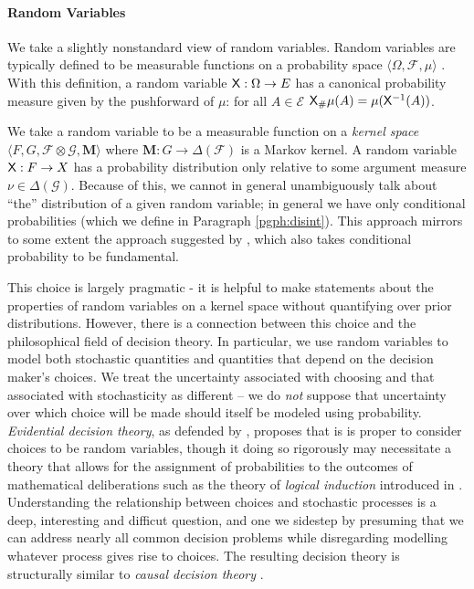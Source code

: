 \paragraph{Random Variables}\label{par:random_variables}

We take a slightly nonstandard view of random variables. Random variables are typically defined to be measurable functions on a probability space $\langle \Omega, \mathcal{F}, \mu\rangle$ \citep{cinlar_probability_2011}. With this definition, a random variable $\mathsf{X}:\Omega\to E$ has a canonical probability measure given by the pushforward of $\mu$: for all $A\in\mathscr{E}$ $\mathsf{X}_\# \mu(A) = \mu(\mathsf{X}^{-1}(A))$.

We take a random variable to be a measurable function on a \emph{kernel space} $\langle F, G, \mathcal{F}\otimes\mathcal{G},\mathbf{M}\rangle$ where $\mathbf{M}:G\to \Delta(\mathcal{F})$ is a Markov kernel. A random variable $\mathsf{X}:F\to X$ has a probability distribution only relative to some argument measure $\nu\in\Delta(\mathcal{G})$. Because of this, we cannot in general unambiguously talk about ``the'' distribution of a given random variable; in general we have only conditional probabilities (which we define in Paragraph \ref{pgph:disint}). This approach mirrors to some extent the approach suggested by \citet{hajek_what_2003}, which also takes conditional probability to be fundamental.

This choice is largely pragmatic - it is helpful to make statements about the properties of random variables on a kernel space without quantifying over prior distributions. However, there is a connection between this choice and the philosophical field of decision theory. In particular, we use random variables to model both stochastic quantities and quantities that depend on the decision maker's choices. We treat the uncertainty associated with choosing and that associated with stochasticity as different -- we do \emph{not} suppose that uncertainty over which choice will be made should itself be modeled using probability. \emph{Evidential decision theory}, as defended by \citet{jeffrey_logic_1981}, proposes that is is proper to consider choices to be random variables, though it  doing so rigorously may necessitate a theory that allows for the assignment of probabilities to the outcomes of mathematical deliberations such as the theory of \emph{logical induction} introduced in \citet{garrabrant_logical_2017}. Understanding the relationship between choices and stochastic processes is a deep, interesting and difficut question, and one we sidestep by presuming that we can address nearly all common decision problems while disregarding modelling whatever process gives rise to choices. The resulting decision theory is structurally similar to \emph{causal decision theory} \citep{lewis_causal_1981}.

